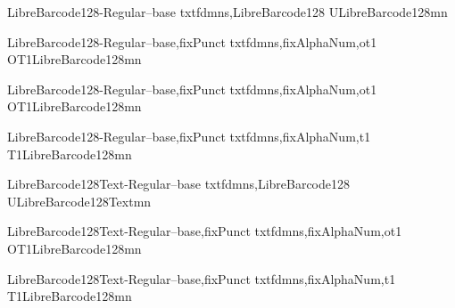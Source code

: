 


%
  {}
%
  {}

\installfonts
{}

%
  {LibreBarcode128-Regular--base}%
  {txtfdmns,LibreBarcode128}%
  {U}{LibreBarcode128}{m}{n}{}

%
  {LibreBarcode128-Regular--base,fixPunct}%
  {txtfdmns,fixAlphaNum,ot1}%
  {OT1}{LibreBarcode128}{m}{n}{}
  
\endinstallfonts

\installfonts
{}

%
  {LibreBarcode128-Regular--base,fixPunct}%
  {txtfdmns,fixAlphaNum,ot1}%
  {OT1}{LibreBarcode128}{m}{n}{}
  
\endinstallfonts

\installfonts
{}

%
  {LibreBarcode128-Regular--base,fixPunct}%
  {txtfdmns,fixAlphaNum,t1}%
  {T1}{LibreBarcode128}{m}{n}{}
  
\endinstallfonts


\installfonts
{}

%
  {LibreBarcode128Text-Regular--base}%
  {txtfdmns,LibreBarcode128}%
  {U}{LibreBarcode128Text}{m}{n}{}
  
\endinstallfonts

\installfonts
{}

%
  {LibreBarcode128Text-Regular--base,fixPunct}%
  {txtfdmns,fixAlphaNum,ot1}%
  {OT1}{LibreBarcode128}{m}{n}{}
  
\endinstallfonts

\installfonts
{}

%
  {LibreBarcode128Text-Regular--base,fixPunct}%
  {txtfdmns,fixAlphaNum,t1}%
  {T1}{LibreBarcode128}{m}{n}{}
  
\endinstallfonts

\endrecordtransforms
\bye
